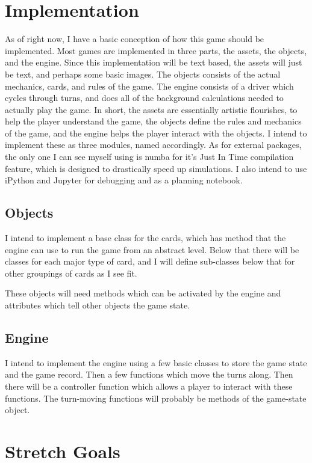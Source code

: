 \documentclass[10pt,letterpaper, twocolumn, science]{revtex4}
\begin{document}
\section{Implementation}

As of right now, I have a basic conception of how this game should be implemented. Most games are implemented in three parts, the assets, the objects, and the engine. Since this implementation will be text based, the assets will just be text, and perhaps some basic images. The objects consists of the actual mechanics, cards, and rules of the game. The engine consists of a driver which cycles through turns, and does all of the background calculations needed to actually play the game. In short, the assets are essentially artistic flourishes, to help the player understand the game, the objects define the rules and mechanics of the game, and the engine helps the player interact with the objects. I intend to implement these as three modules, named accordingly. As for external packages, the only one I can see myself using is numba\cite{numba} for it's Just In Time compilation feature, which is designed to drastically speed up simulations. I also intend to use iPython and Jupyter for debugging and as a planning notebook.

\subsection{Objects}
I intend to implement a base class for the cards, which has method that the engine can use to run the game from an abstract level. Below that there will be classes for each major type of card, and I will define sub-classes below that for other groupings of cards as I see fit.

These objects will need methods which can be activated by the engine and attributes which tell other objects the game state.


\subsection{Engine}

I intend to implement the engine using a few basic classes to store the game state and the game record. Then a few functions which move the turns along. Then there will be a controller function which allows a player to interact with these functions. The turn-moving functions will probably be methods of the game-state object.

\section{Stretch Goals}
\end{document}
